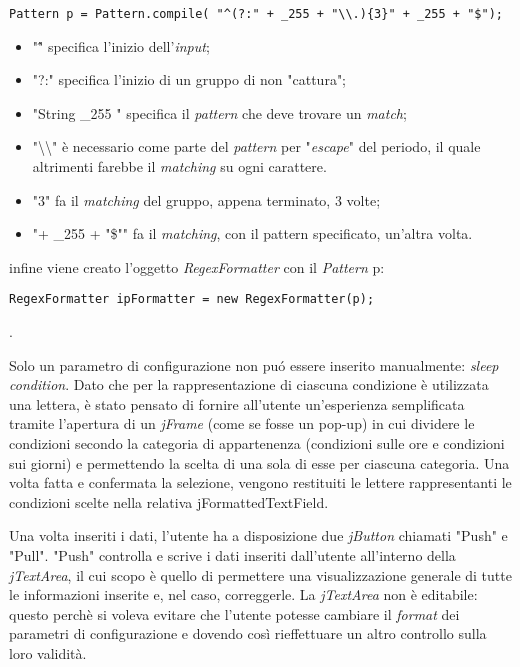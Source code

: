 \vspace{0.5cm}
\begin{lstlisting}
Pattern p = Pattern.compile( "^(?:" + _255 + "\\.){3}" + _255 + "$");
\end{lstlisting}

\begin{itemize}
	\item "\^"  specifica l'inizio dell'\textit{input};
	\item "?:" specifica l'inizio di un gruppo di non "cattura";
	\item "String \_255 " specifica il \textit{pattern} che deve trovare un \textit{match};
	\item "\textbackslash\textbackslash "  \`{e} necessario come parte del \textit{pattern} per "\textit{escape}" del periodo, il quale altrimenti farebbe il \textit{matching} su ogni carattere.
	\item "{3}" fa il \textit{matching} del gruppo, appena terminato, 3 volte; 
	\item "{{+ \_255 + "\$"}}" fa il \textit{matching}, con il pattern specificato, un'altra volta.
\end{itemize}
infine viene creato l'oggetto \textit{RegexFormatter} con il \textit{Pattern} p:

\vspace{0.5cm}
\begin{lstlisting}
RegexFormatter ipFormatter = new RegexFormatter(p);
\end{lstlisting}.

Solo un parametro di configurazione non pu\'o essere inserito manualmente: \textit{sleep condition}. Dato che per la rappresentazione di ciascuna condizione \`{e} utilizzata una lettera, \`{e} stato pensato di fornire all'utente un'esperienza semplificata tramite l'apertura di un \textit{jFrame} (come se fosse un pop-up) in cui dividere le condizioni secondo la categoria di appartenenza (condizioni sulle ore e condizioni sui giorni) e permettendo la scelta di una sola di esse per ciascuna categoria. Una volta fatta e confermata la selezione, vengono restituiti le lettere rappresentanti le condizioni scelte nella relativa {jFormattedTextField}. 

Una volta inseriti i dati, l'utente ha a disposizione due \textit{jButton} chiamati "Push" e "Pull".
"Push" controlla e scrive i dati inseriti dall'utente all'interno della \textit{jTextArea}, il cui scopo \`{e} quello di permettere una visualizzazione generale di tutte le informazioni inserite e, nel caso, correggerle. La \textit{jTextArea} non \`{e} editabile: questo perch\`{e} si voleva evitare che l'utente potesse cambiare il \textit{format} dei parametri di configurazione e dovendo cos\`{i} rieffettuare un altro controllo sulla loro validit\`{a}.

